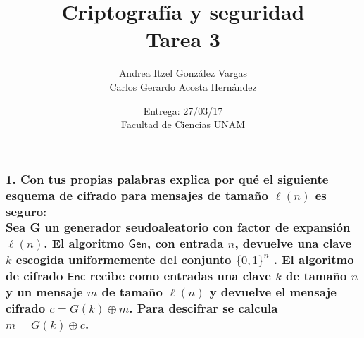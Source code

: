 \documentclass[12pt]{article}
\title{Criptografía y seguridad \\ Tarea 3}
\author{Andrea Itzel González Vargas \\ Carlos Gerardo Acosta Hernández}
\date{Entrega: 27/03/17 \\ Facultad de Ciencias UNAM}
\begin{document}
\maketitle
\subsubsection*{1. Con tus propias palabras explica por qué el siguiente esquema de cifrado para mensajes de tamaño $\ell(n)$ es seguro: \\
Sea G un generador seudoaleatorio con factor de expansión $\ell (n)$. El algoritmo $\textsf{Gen}$, con entrada $n$, devuelve una clave $k$ escogida uniformemente del conjunto $\{0, 1\}^n$ . El algoritmo de cifrado $\textsf{Enc}$ recibe como entradas una clave $k$ de tamaño $n$ y un mensaje $m$ de tamaño $\ell (n)$ y devuelve el mensaje cifrado $c = G(k) \oplus m$. Para descifrar se calcula $m = G(k) \oplus c$.}
\end{document}

